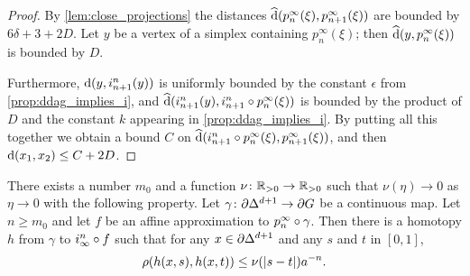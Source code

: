 \documentclass[a4paper]{article}
\begin{document}
\begin{proof}
  By \cref{lem:close_projections} the distances $\operatorname{\widehat{d}}(p^\infty_n(\xi),
  p^\infty_{n+1}(\xi))$ are bounded by $6\delta + 3 + 2D$. Let $y$ be a vertex
  of a simplex containing $p^\infty_n(\xi)$; then $\operatorname{\widehat{d}}(y, p^\infty_n(\xi))$
  is bounded by $D$.
  
  Furthermore, $\operatorname{d}(y, i^n_{n+1}(y))$ is uniformly bounded by the constant
  $\epsilon$ from \cref{prop:ddag_implies_i}, and $\operatorname{\widehat{d}}(i^n_{n+1}(y),
  i^n_{n+1}\circ p^\infty_n (\xi))$ is bounded by the product of $D$ and
  the constant $k$ appearing in \cref{prop:ddag_implies_i}. By putting all this
  together we obtain a bound $C$ on $\operatorname{\widehat{d}}(i^n_{n+1}\circ
  p^\infty_n(\xi), p^\infty_{n+1}(\xi))$, and then $\operatorname{d}(x_1, x_2) \leq C +
  2D$.
\end{proof}

\begin{proposition}\label{prop:uniform_homotopies}
  There exists a number $m_0$ and a function $\nu\colon\mathbb{R}_{>0}\to\mathbb{R}_{>0}$ such
  that $\nu(\eta)\to0$ as $\eta\to0$ with the following property. Let
  $\gamma\colon\partial\Delta^{d+1}\to\partial G$ be a continuous map. Let $n
  \geq m_0$ and let $f$ be an affine approximation to
  $p^\infty_n\circ\gamma$. Then there is a homotopy $h$ from $\gamma$ to
  $i^n_\infty\circ f$ such that for any $x \in \partial\Delta^{d+1}$ and
  any $s$ and $t$ in $[0,1]$,
  \begin{align*}
    \rho(h(x,s), h(x,t)) \leq \nu(\left|s-t\right|) a^{-n}.
  \end{align*}
\end{proposition}
\end{document}
